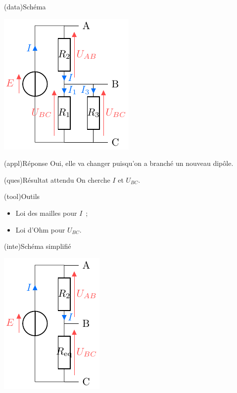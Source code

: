 \documentclass[../../main/main.tex]{subfiles}
\begin{document}
{\begin{tcbraster}[raster columns=3, raster equal height=rows]
    \begin{tcb}(data){Schéma}
        \begin{center}
            \includegraphics{divtens_b}
        \end{center}
    \end{tcb}
    \begin{tcolorbox}[blankest, raster multicolumn=1, space to=\myspace]
        \begin{tcbraster}[raster columns=1]
            \begin{tcb}(appl){Réponse}
                Oui, elle va changer puisqu'on a branché un nouveau dipôle.
            \end{tcb}
            \begin{tcb}(ques){Résultat attendu}
                On cherche $I$ et $U_{BC}$.
            \end{tcb}
            \begin{tcb}[add to natural height=\myspace](tool){Outils}
                \begin{itemize}[leftmargin=10pt]
                    \item Loi des mailles pour $I$~;
                    \item Loi d'Ohm pour $U_{BC}$.
                \end{itemize}
            \end{tcb}
        \end{tcbraster}
    \end{tcolorbox}
    \begin{tcb}(inte){Schéma simplifié}
        \begin{center}
            \includegraphics{divtens_b-simple}

\end{center}
\end{tcb}
\end{tcbraster}}
\end{document}
